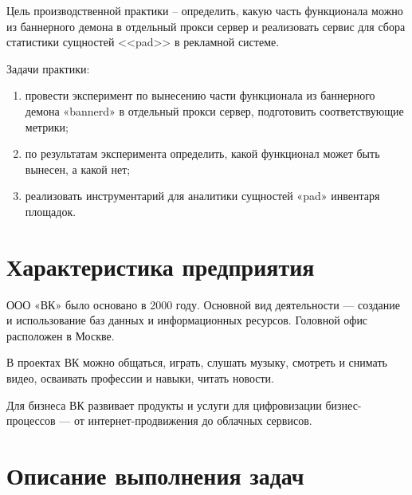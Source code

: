 



	

\normalsize

\setcounter{page}{2}

\tableofcontents
\normalsize

\pagebreak


Цель производственной практики -- определить, какую часть функционала можно из баннерного демона в отдельный прокси сервер и реализовать сервис для сбора статистики сущностей <<pad>> в рекламной системе.

Задачи практики:
\begin{enumerate}
	\item провести эксперимент по вынесению части функционала из баннерного демона «bannerd» в отдельный прокси сервер, подготовить соответствующие метрики;
	\item по результатам эксперимента определить, какой функционал может быть вынесен, а какой нет;
	\item реализовать инструментарий для аналитики сущностей «pad» инвентаря площадок.
\end{enumerate}

\clearpage

\section{Характеристика предприятия}

ООО «ВК»\cite{vk} было основано в 2000 году. Основной вид деятельности --- создание и использование баз данных и информационных ресурсов. Головной офис расположен в Москве.

В проектах ВК можно общаться, играть, слушать музыку, смотреть и снимать видео, осваивать профессии и навыки, читать новости. 

Для бизнеса ВК развивает продукты и услуги для цифровизации бизнес-процессов — от интернет-продвижения до облачных сервисов.



\clearpage

\section{Описание выполнения задач}

